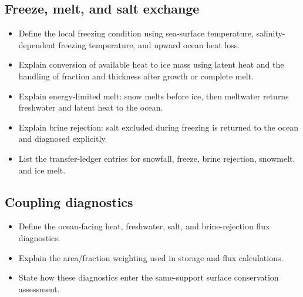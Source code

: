 \subsection{Freeze, melt, and salt exchange}
\begin{itemize}
  \item Define the local freezing condition using sea-surface temperature, salinity-dependent freezing temperature, and upward ocean heat loss.
  \item Explain conversion of available heat to ice mass using latent heat and the handling of fraction and thickness after growth or complete melt.
  \item Explain energy-limited melt: snow melts before ice, then meltwater returns freshwater and latent heat to the ocean.
  \item Explain brine rejection: salt excluded during freezing is returned to the ocean and diagnosed explicitly.
  \item List the transfer-ledger entries for snowfall, freeze, brine rejection, snowmelt, and ice melt.
\end{itemize}

\subsection{Coupling diagnostics}
\begin{itemize}
  \item Define the ocean-facing heat, freshwater, salt, and brine-rejection flux diagnostics.
  \item Explain the area/fraction weighting used in storage and flux calculations.
  \item State how these diagnostics enter the same-support surface conservation assessment.
\end{itemize}

